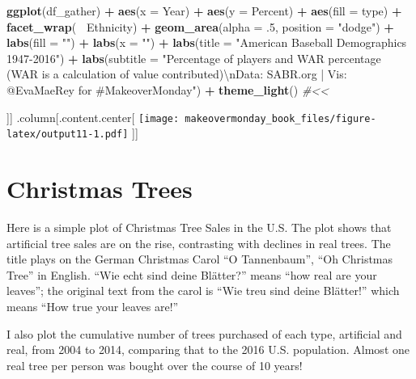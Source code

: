 \documentclass[]{book}
\newenvironment{Shaded}{\begin{snugshade}}{\end{snugshade}}
\newcommand{\KeywordTok}[1]{\textcolor[rgb]{0.13,0.29,0.53}{\textbf{#1}}}
\newcommand{\DataTypeTok}[1]{\textcolor[rgb]{0.13,0.29,0.53}{#1}}
\newcommand{\DecValTok}[1]{\textcolor[rgb]{0.00,0.00,0.81}{#1}}
\newcommand{\CharTok}[1]{\textcolor[rgb]{0.31,0.60,0.02}{#1}}
\newcommand{\StringTok}[1]{\textcolor[rgb]{0.31,0.60,0.02}{#1}}
\newcommand{\CommentTok}[1]{\textcolor[rgb]{0.56,0.35,0.01}{\textit{#1}}}
\newcommand{\OperatorTok}[1]{\textcolor[rgb]{0.81,0.36,0.00}{\textbf{#1}}}
\newcommand{\NormalTok}[1]{#1}
\theoremstyle{definition}
\theoremstyle{definition}
\theoremstyle{definition}
\theoremstyle{remark}
\begin{document}
\begin{Shaded}
\begin{Highlighting}[]
\KeywordTok{ggplot}\NormalTok{(df_gather) }\OperatorTok{+}
\StringTok{  }\KeywordTok{aes}\NormalTok{(}\DataTypeTok{x =}\NormalTok{ Year) }\OperatorTok{+}
\StringTok{  }\KeywordTok{aes}\NormalTok{(}\DataTypeTok{y =}\NormalTok{ Percent) }\OperatorTok{+}
\StringTok{  }\KeywordTok{aes}\NormalTok{(}\DataTypeTok{fill =}\NormalTok{ type) }\OperatorTok{+}
\StringTok{  }\KeywordTok{facet_wrap}\NormalTok{(}\OperatorTok{~}\StringTok{ }\NormalTok{Ethnicity) }\OperatorTok{+}
\StringTok{  }\KeywordTok{geom_area}\NormalTok{(}\DataTypeTok{alpha =}\NormalTok{ .}\DecValTok{5}\NormalTok{, }\DataTypeTok{position =} \StringTok{"dodge"}\NormalTok{) }\OperatorTok{+}
\StringTok{  }\KeywordTok{labs}\NormalTok{(}\DataTypeTok{fill =} \StringTok{""}\NormalTok{) }\OperatorTok{+}
\StringTok{  }\KeywordTok{labs}\NormalTok{(}\DataTypeTok{x =} \StringTok{""}\NormalTok{) }\OperatorTok{+}
\StringTok{  }\KeywordTok{labs}\NormalTok{(}\DataTypeTok{title =} \StringTok{"American Baseball Demographics 1947-2016"}\NormalTok{) }\OperatorTok{+}
\StringTok{  }\KeywordTok{labs}\NormalTok{(}\DataTypeTok{subtitle =} \StringTok{"Percentage of players and WAR percentage (WAR is a calculation of value contributed)}\CharTok{\textbackslash{}n}\StringTok{Data: SABR.org | Vis: @EvaMaeRey for #MakeoverMonday"}\NormalTok{) }\OperatorTok{+}
\StringTok{  }\KeywordTok{theme_light}\NormalTok{()  }\CommentTok{#<<}
\end{Highlighting}
\end{Shaded}

{]}{]} .column{[}.content.center{[}
\texttt{[image: makeovermonday\_book\_files/figure-latex/output11-1.pdf]}
{]}{]}

\chapter{Christmas Trees}\label{christmas-trees}

Here is a simple plot of Christmas Tree Sales in the U.S. The plot shows
that artificial tree sales are on the rise, contrasting with declines in
real trees. The title plays on the German Christmas Carol ``O
Tannenbaum'', ``Oh Christmas Tree'' in English. ``Wie echt sind deine
Blätter?'' means ``how real are your leaves''; the original text from
the carol is ``Wie treu sind deine Blätter!'' which means ``How true
your leaves are!''

I also plot the cumulative number of trees purchased of each type,
artificial and real, from 2004 to 2014, comparing that to the 2016 U.S.
population. Almost one real tree per person was bought over the course
of 10 years!
\end{document}
